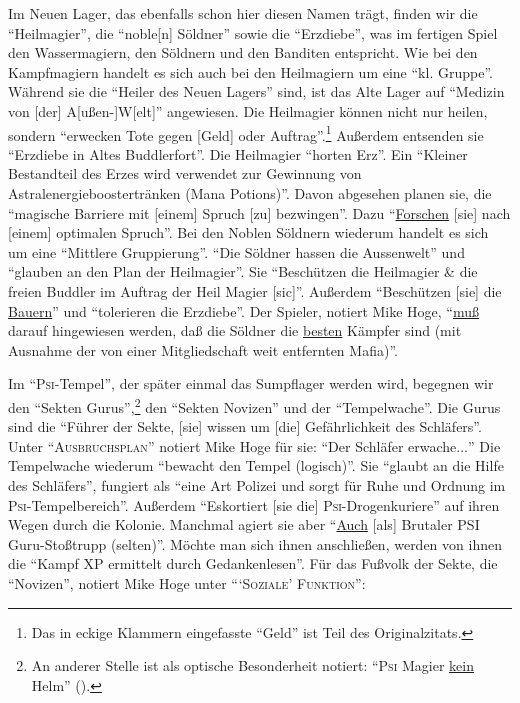 \documentclass[a5paper,pagesize,numbers=noenddot]{scrbook}
\begin{document}
Im Neuen Lager, das ebenfalls schon hier diesen Namen trägt, finden wir die \enquote{Heilmagier}, die \enquote{noble[n] Söldner} sowie die \enquote{Erzdiebe}, was im fertigen Spiel den Wassermagiern, den Söldnern und den Banditen entspricht.
Wie bei den Kampfmagiern handelt es sich auch bei den Heilmagiern um eine \enquote{kl. Gruppe}.
Während sie die \enquote{Heiler des Neuen Lagers} sind, ist das Alte Lager auf \enquote{Medizin von [der] A[ußen-]W[elt]} angewiesen.
Die Heilmagier können nicht nur heilen, sondern \enquote{erwecken Tote gegen [Geld] oder Auftrag}.\footnote{Das in eckige Klammern eingefasste \enquote{Geld} ist Teil des Originalzitats.}
Außerdem entsenden sie \enquote{Erzdiebe in Altes Buddlerfort}.
Die Heilmagier \enquote{horten Erz}.
Ein \enquote{Kleiner Bestandteil des Erzes wird verwendet zur Gewinnung von Astralenergieboostertränken (Mana Potions)}.
Davon abgesehen planen sie, die \enquote{magische Barriere mit [einem] Spruch [zu] bezwingen}.
Dazu \enquote{\uline{Forschen} [sie] nach [einem] optimalen Spruch}.
Bei den Noblen Söldnern wiederum handelt es sich um eine \enquote{Mittlere Gruppierung}.
\enquote{Die Söldner hassen die Aussenwelt} und \enquote{glauben an den Plan der Heilmagier}.
Sie \enquote{Beschützen die Heilmagier \& die freien Buddler im Auftrag der Heil Magier [sic]}. Außerdem \enquote{Beschützen [sie] die \uline{Bauern}} und \enquote{tolerieren die Erzdiebe}.
Der Spieler, notiert Mike Hoge, \enquote{\uline{muß} darauf hingewiesen werden, daß die Söldner die \uline{besten} Kämpfer sind (mit Ausnahme der von einer Mitgliedschaft weit entfernten Mafia)}.

Im \enquote{\textsc{Psi}-Tempel}, der später einmal das Sumpflager werden wird, begegnen wir den \enquote{Sekten Gurus},\footnote{An anderer Stelle ist als optische Besonderheit notiert: \enquote{\textsc{Psi} Magier \uline{kein} Helm} (\autocite[S.~7]{orpheus_b_scribbles}).} den \enquote{Sekten Novizen} und der \enquote{Tempelwache}.
Die Gurus sind die \enquote{Führer der Sekte, [sie] wissen um [die] Gefährlichkeit des Schläfers}.
Unter \enquote{\textsc{Ausbruchsplan}} notiert Mike Hoge für sie: \enquote{Der Schläfer erwache$\ldots$}
Die Tempelwache wiederum \enquote{bewacht den Tempel (logisch)}.
Sie \enquote{glaubt an die Hilfe des Schläfers}, fungiert als \enquote{eine Art Polizei und sorgt für Ruhe und Ordnung im \textsc{Psi}-Tempelbereich}.
Außerdem \enquote{Eskortiert [sie die] \textsc{Psi}-Drogenkuriere} auf ihren Wegen durch die Kolonie.
Manchmal agiert sie aber \enquote{\uline{Auch} [als] Brutaler \textsc{PSI} Guru-Stoßtrupp (selten)}.
Möchte man sich ihnen anschließen, werden von ihnen die \enquote{Kampf XP ermittelt durch Gedankenlesen}.
Für das Fußvolk der Sekte, die \enquote{Novizen}, notiert Mike Hoge unter \enquote{\enquote{\textsc{Soziale}} \textsc{Funktion}}:
\end{document}
